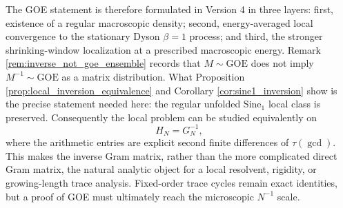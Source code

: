 \documentclass[11pt]{amsart}
\numberwithin{equation}{section}
\theoremstyle{plain}
\theoremstyle{definition}
\theoremstyle{remark}
\begin{document}
The GOE statement is therefore formulated in Version 4 in three layers: first, existence of a regular macroscopic density; second, energy-averaged local convergence to the stationary Dyson $\beta=1$ process; and third, the stronger shrinking-window localization at a prescribed macroscopic energy.  Remark \ref{rem:inverse_not_goe_ensemble} records that $M\sim\mathrm{GOE}$ does not imply $M^{-1}\sim\mathrm{GOE}$ as a matrix distribution.  What Proposition \ref{prop:local_inversion_equivalence} and Corollary \ref{cor:sine1_inversion} show is the precise statement needed here: the regular unfolded $\mathrm{Sine}_1$ local class is preserved.  Consequently the local problem can be studied equivalently on
\begin{equation}
H_N=G_N^{-1},
\end{equation}
where the arithmetic entries are explicit second finite differences of $\tau(\gcd)$.  This makes the inverse Gram matrix, rather than the more complicated direct Gram matrix, the natural analytic object for a local resolvent, rigidity, or growing-length trace analysis.  Fixed-order trace cycles remain exact identities, but a proof of GOE must ultimately reach the microscopic $N^{-1}$ scale.
\end{document}
